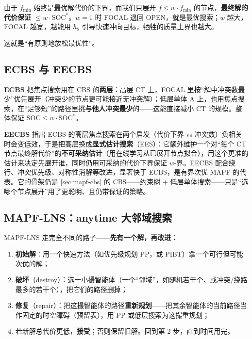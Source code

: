 \begin{theorem}[焦点搜索的有界次优性]\label{thm:mapf-focal}
由于 $f_{\min}$ 始终是最优解代价的下界，而我们只展开 $f\le w\cdot f_{\min}$ 的节点，\textbf{最终解的代价保证 $\le w\cdot\mathrm{SOC}^*$}\cite{pearl1982focal,barer2014ecbs}。$w=1$ 时 FOCAL 退回 OPEN，就是最优搜索；$w$ 越大，FOCAL 越宽，越能用 $h_2$ 引导快速冲向目标，牺牲的质量上界也越大。
\end{theorem}

这就是“有原则地放松最优性”。

\subsection{ECBS 与 EECBS}
\label{sec:mapf-eecbs}

\textbf{ECBS} 把焦点搜索用在 CBS 的\textbf{两层}：高层 CT 上，FOCAL 里按“解中冲突数最少”优先展开（冲突少的节点更可能接近无冲突解）；低层单体 A\* 上，也用焦点搜索，在“足够短”的路径里挑\textbf{与他人冲突最少}的——这能直接减小 CT 的规模\cite{barer2014ecbs}。整体保证 $\mathrm{SOC}\le w\cdot\mathrm{SOC}^*$。

\textbf{EECBS} 指出 ECBS 的高层焦点搜索在两个启发（代价下界 vs 冲突数）负相关时会变低效，于是把高层换成\textbf{显式估计搜索}（EES）：它额外维护一个对“每个 CT 节点最终解代价”的\textbf{不可采纳估计}（用在线学习从已展开节点拟合），用这个更准的估计来决定先展开谁，同时仍用可采纳的代价下界保证 $w$-界\cite{li2021eecbs}。EECBS 配合绕行、冲突优先级、对称性消解等改进，显著快于 ECBS，是有界次优 MAPF 的代表。它的骨架仍是 \cref{sec:mapf-cbs} 的 CBS——约束树 $+$ 低层单体搜索——只是“选哪个节点展开”用了更聪明、且仍带保证的策略。

\subsection{MAPF-LNS：anytime 大邻域搜索}
\label{sec:mapf-lns}

MAPF-LNS 走完全不同的路子——\textbf{先有一个解，再改进}\cite{li2021lns}：

\begin{algo}\label{algo:mapf-lns}
\begin{enumerate}
  \item \textbf{初始解}：用一个快速方法（如优先级规划 PP，或 PIBT）拿一个可行但可能次优的解；
  \item \textbf{破坏}（destroy）：选一小撮智能体（一个“邻域”，如随机若干个、或冲突/绕路最多的若干个），把它们的路径删掉；
  \item \textbf{修复}（repair）：把这撮智能体的路径\textbf{重新规划}——把其余智能体的当前路径当作固定的时空障碍（预留表），用 PP 或低层搜索为这撮重规划；
  \item 若新解总代价更低，\textbf{接受}；否则保留旧解。回到第 $2$ 步，直到时间用完。
\end{enumerate}
\end{algo}

